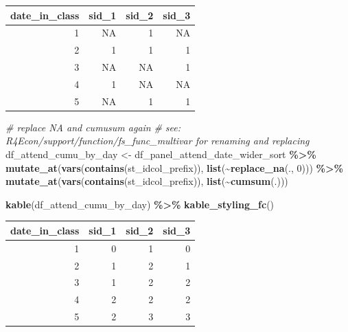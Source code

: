 \documentclass[
]{book}
\newenvironment{Shaded}{\begin{snugshade}}{\end{snugshade}}
\newcommand{\CommentTok}[1]{\textcolor[rgb]{0.56,0.35,0.01}{\textit{#1}}}
\newcommand{\DecValTok}[1]{\textcolor[rgb]{0.00,0.00,0.81}{#1}}
\newcommand{\KeywordTok}[1]{\textcolor[rgb]{0.13,0.29,0.53}{\textbf{#1}}}
\newcommand{\NormalTok}[1]{#1}
\newcommand{\OperatorTok}[1]{\textcolor[rgb]{0.81,0.36,0.00}{\textbf{#1}}}
\newcommand{\StringTok}[1]{\textcolor[rgb]{0.31,0.60,0.02}{#1}}
\begin{document}
\begin{table}[!h]
\centering
\begin{tabular}{r|r|r|r}
\hline
date\_in\_class & sid\_1 & sid\_2 & sid\_3\\
\hline
\rowcolor{gray!6}  1 & NA & 1 & NA\\
\hline
2 & 1 & 1 & 1\\
\hline
\rowcolor{gray!6}  3 & NA & NA & 1\\
\hline
4 & 1 & NA & NA\\
\hline
\rowcolor{gray!6}  5 & NA & 1 & 1\\
\hline
\end{tabular}
\end{table}

\begin{Shaded}
\begin{Highlighting}[]
\CommentTok{\# replace NA and cumusum again}
\CommentTok{\# see: R4Econ/support/function/fs\_func\_multivar for renaming and replacing}
\NormalTok{df\_attend\_cumu\_by\_day \textless{}{-}}\StringTok{ }\NormalTok{df\_panel\_attend\_date\_wider\_sort }\OperatorTok{\%\textgreater{}\%}
\StringTok{  }\KeywordTok{mutate\_at}\NormalTok{(}\KeywordTok{vars}\NormalTok{(}\KeywordTok{contains}\NormalTok{(st\_idcol\_prefix)), }\KeywordTok{list}\NormalTok{(}\OperatorTok{\textasciitilde{}}\KeywordTok{replace\_na}\NormalTok{(., }\DecValTok{0}\NormalTok{))) }\OperatorTok{\%\textgreater{}\%}
\StringTok{  }\KeywordTok{mutate\_at}\NormalTok{(}\KeywordTok{vars}\NormalTok{(}\KeywordTok{contains}\NormalTok{(st\_idcol\_prefix)), }\KeywordTok{list}\NormalTok{(}\OperatorTok{\textasciitilde{}}\KeywordTok{cumsum}\NormalTok{(.)))}

\KeywordTok{kable}\NormalTok{(df\_attend\_cumu\_by\_day) }\OperatorTok{\%\textgreater{}\%}
\StringTok{  }\KeywordTok{kable\_styling\_fc}\NormalTok{()}
\end{Highlighting}
\end{Shaded}

\begin{table}[!h]
\centering
\begin{tabular}{r|r|r|r}
\hline
date\_in\_class & sid\_1 & sid\_2 & sid\_3\\
\hline
\rowcolor{gray!6}  1 & 0 & 1 & 0\\
\hline
2 & 1 & 2 & 1\\
\hline
\rowcolor{gray!6}  3 & 1 & 2 & 2\\
\hline
4 & 2 & 2 & 2\\
\hline
\rowcolor{gray!6}  5 & 2 & 3 & 3\\
\hline
\end{tabular}
\end{table}
\end{document}
